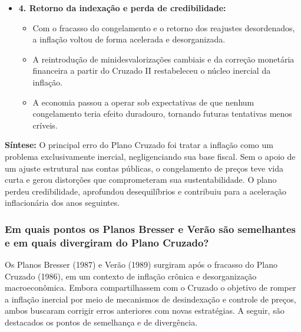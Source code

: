 \documentclass[a4paper,12pt]{article}[abntex2]
\begin{document}
\begin{itemize}
    \item \textbf{4. Retorno da indexação e perda de credibilidade:}
    \begin{itemize}
        \item Com o fracasso do congelamento e o retorno dos reajustes desordenados, a inflação voltou de forma acelerada e desorganizada.
        \item A reintrodução de minidesvalorizações cambiais e da correção monetária financeira a partir do Cruzado II restabeleceu o núcleo inercial da inflação.
        \item A economia passou a operar sob expectativas de que nenhum congelamento teria efeito duradouro, tornando futuras tentativas menos críveis.
    \end{itemize}
\end{itemize}

\textbf{Síntese:} O principal erro do Plano Cruzado foi tratar a inflação como um problema exclusivamente inercial, negligenciando sua base fiscal. Sem o apoio de um ajuste estrutural nas contas públicas, o congelamento de preços teve vida curta e gerou distorções que comprometeram sua sustentabilidade. O plano perdeu credibilidade, aprofundou desequilíbrios e contribuiu para a aceleração inflacionária dos anos seguintes.

\subsubsection{\textbf{Em quais pontos os Planos Bresser e Verão são semelhantes e em quais divergiram do Plano Cruzado?}}

Os Planos Bresser (1987) e Verão (1989) surgiram após o fracasso do Plano Cruzado (1986), em um contexto de inflação crônica e desorganização macroeconômica. Embora compartilhassem com o Cruzado o objetivo de romper a inflação inercial por meio de mecanismos de desindexação e controle de preços, ambos buscaram corrigir erros anteriores com novas estratégias. A seguir, são destacados os pontos de semelhança e de divergência.
\end{document}
